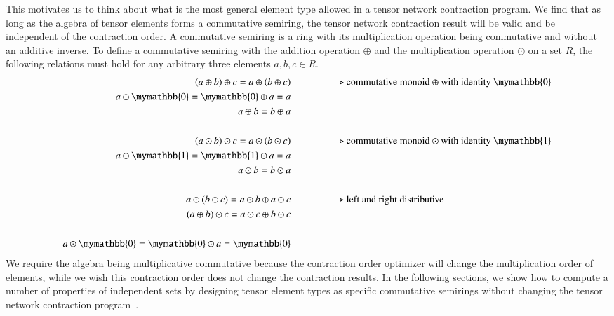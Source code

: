 \documentclass[onefignum, onetabnum]{siamart190516}
\newcommand{\<}{\langle}
\renewcommand{\>}{\rangle}
\begin{document}
This motivates us to think about what is the most general element type allowed in a tensor network contraction program.
We find that as long as the algebra of tensor elements forms a commutative semiring, the tensor network contraction result will be valid and be independent of the contraction order.
A commutative semiring is a ring with its multiplication operation being commutative and without an additive inverse.
To define a commutative semiring with the addition operation $\oplus$ and the multiplication operation $\odot$ on a set $R$, the following relations must hold for any arbitrary three elements $a, b, c \in R$.
\begin{align*}
(a \oplus b) \oplus c = a \oplus (b \oplus c) & \hspace{5em}\text{$\triangleright$ commutative monoid $\oplus$ with identity $\mymathbb{0}$}\\
a \oplus \mymathbb{0} = \mymathbb{0} \oplus a = a &\\
a \oplus b = b \oplus a &\\
&\\
(a \odot b) \odot c = a \odot (b \odot c)  &   \hspace{5em}\text{$\triangleright$ commutative monoid $\odot$ with identity $\mymathbb{1}$}\\
a \odot  \mymathbb{1} =  \mymathbb{1} \odot a = a &\\
a \odot b = b \odot a &\\
&\\
a \odot (b\oplus c) = a\odot b \oplus a\odot c  &  \hspace{5em}\text{$\triangleright$ left and right distributive}\\
(a\oplus b) \odot c = a\odot c \oplus b\odot c &\\
&\\
a \odot \mymathbb{0} = \mymathbb{0} \odot a = \mymathbb{0}
\end{align*}
We require the algebra being multiplicative commutative because the contraction order optimizer will change the multiplication order of elements, while we wish this contraction order does not change the contraction results.
In the following sections, we show how to compute a number of properties of independent sets by designing tensor element types as specific commutative semirings without changing the tensor network contraction program~\cite{Stepanov2014}.
%
\end{document}
